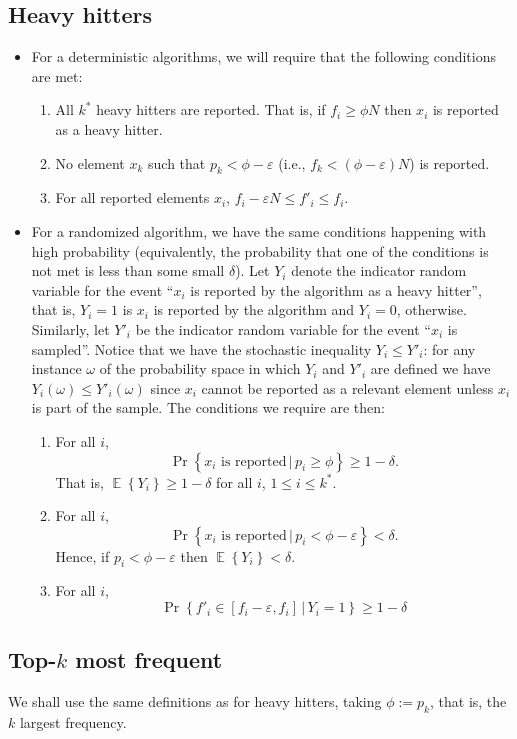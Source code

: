 \documentclass{article}
\newcommand{\Prob}[1]{\Pr\left\{{#1}\right\}}
\newcommand{\Exp}[1]{\mathop{\mathbb{E}}\left\{{#1}\right\}}
\begin{document}
\subsection{Heavy hitters}
\begin{itemize}
\item For a deterministic algorithms, we will require that the following
  conditions are met:
  \begin{enumerate}
  \item All $k^\ast$ heavy hitters are reported. That is, if
    $f_i \ge \phi N$ then $x_i$ is reported as a heavy hitter.
  \item No element $x_k$ such that $p_k < \phi-\varepsilon$ (i.e., $f_k < (\phi-\varepsilon) N$) is reported.
  \item For all reported elements $x_i$, $f_i-\varepsilon N \le f'_i\le f_i$.
  \end{enumerate}
\item For a randomized algorithm, we have the same conditions
  happening with high probability (equivalently, the probability that
  one of the conditions is not met is less than some small $\delta$).
  Let $Y_i$ denote the indicator random variable for the event ``$x_i$
  is reported by the algorithm as a heavy hitter'', that is,
  $Y_i=1$ is $x_i$ is reported by the algorithm and $Y_i=0$,
  otherwise.  Similarly, let $Y'_i$ be the indicator random variable
  for the event ``$x_i$ is sampled''. Notice that we have the
  stochastic inequality $Y_i\le Y'_i$: for any instance $\omega$ of
  the probability space in which $Y_i$ and $Y'_i$ are defined we have
  $Y_i(\omega) \le Y'_i(\omega)$ since $x_i$ cannot be reported as a
  relevant element unless $x_i$ is part of the sample.
  The conditions we require are then:
    \begin{enumerate}
    \item For all $i$,
      \[
      \Prob{\text{$x_i$ is reported}\,|\,p_i\ge \phi} \ge 1-\delta.
      \]
      That is, $\Exp{Y_i}\ge 1-\delta$ for all $i$, $1\le i\le k^\ast$.
    \item For all $i$,
      \[
      \Prob{\text{$x_i$ is reported}\,|\,p_i< \phi-\varepsilon} < \delta.
      \]
      Hence, if $p_i < \phi-\varepsilon$ then $\Exp{Y_i}<\delta$.
    \item For all $i$,
      \[
      \Prob{f'_i\in [f_i-\varepsilon,f_i]\,|\,Y_i=1}\ge 1-\delta
      \]
    \end{enumerate}
\end{itemize}
\subsection{Top-$k$ most frequent}
We shall use the same definitions as for heavy hitters,
taking $\phi:=p_k$, that is,
the $k$ largest frequency.
\end{document}
